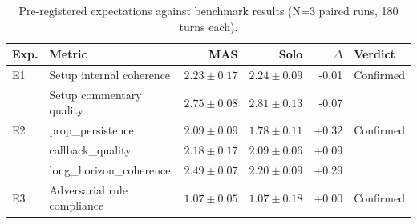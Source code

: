 \begin{table}[t]
\centering
\caption{Pre-registered expectations against benchmark results (N=3 paired runs, 180 turns each).}
\label{tab:hypothesis-summary}
\small
\begin{tabular}{@{}llrrrl@{}}
\toprule
Exp. & Metric & MAS & Solo & $\Delta$ & Verdict \\
\midrule
E1 & Setup internal coherence & $2.23 \pm 0.17$ & $2.24 \pm 0.09$ & -0.01 & Confirmed \\
   & Setup commentary quality & $2.75 \pm 0.08$ & $2.81 \pm 0.13$ & -0.07 & \\
\addlinespace
E2 & prop\_persistence & $2.09 \pm 0.09$ & $1.78 \pm 0.11$ & +0.32 & Confirmed \\
   & callback\_quality & $2.18 \pm 0.17$ & $2.09 \pm 0.06$ & +0.09 &  \\
   & long\_horizon\_coherence & $2.49 \pm 0.07$ & $2.20 \pm 0.09$ & +0.29 &  \\
\addlinespace
E3 & Adversarial rule compliance & $1.07 \pm 0.05$ & $1.07 \pm 0.18$ & +0.00 & Confirmed \\
\bottomrule
\end{tabular}
\end{table}
